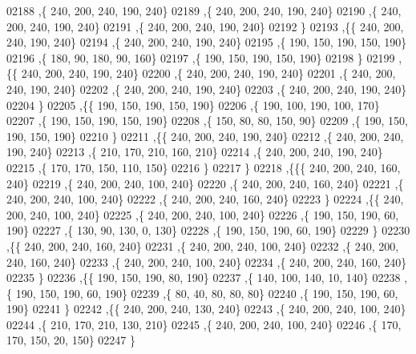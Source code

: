 \begin{DoxyCode}
02188     ,\{   240,   200,   240,   190,   240\}
02189     ,\{   240,   200,   240,   190,   240\}
02190     ,\{   240,   200,   240,   190,   240\}
02191     ,\{   240,   200,   240,   190,   240\}
02192     \}
02193    ,\{\{   240,   200,   240,   190,   240\}
02194     ,\{   240,   200,   240,   190,   240\}
02195     ,\{   190,   150,   190,   150,   190\}
02196     ,\{   180,    90,   180,    90,   160\}
02197     ,\{   190,   150,   190,   150,   190\}
02198     \}
02199    ,\{\{   240,   200,   240,   190,   240\}
02200     ,\{   240,   200,   240,   190,   240\}
02201     ,\{   240,   200,   240,   190,   240\}
02202     ,\{   240,   200,   240,   190,   240\}
02203     ,\{   240,   200,   240,   190,   240\}
02204     \}
02205    ,\{\{   190,   150,   190,   150,   190\}
02206     ,\{   190,   100,   190,   100,   170\}
02207     ,\{   190,   150,   190,   150,   190\}
02208     ,\{   150,    80,    80,   150,    90\}
02209     ,\{   190,   150,   190,   150,   190\}
02210     \}
02211    ,\{\{   240,   200,   240,   190,   240\}
02212     ,\{   240,   200,   240,   190,   240\}
02213     ,\{   210,   170,   210,   160,   210\}
02214     ,\{   240,   200,   240,   190,   240\}
02215     ,\{   170,   170,   150,   110,   150\}
02216     \}
02217    \}
02218   ,\{\{\{   240,   200,   240,   160,   240\}
02219     ,\{   240,   200,   240,   100,   240\}
02220     ,\{   240,   200,   240,   160,   240\}
02221     ,\{   240,   200,   240,   100,   240\}
02222     ,\{   240,   200,   240,   160,   240\}
02223     \}
02224    ,\{\{   240,   200,   240,   100,   240\}
02225     ,\{   240,   200,   240,   100,   240\}
02226     ,\{   190,   150,   190,    60,   190\}
02227     ,\{   130,    90,   130,     0,   130\}
02228     ,\{   190,   150,   190,    60,   190\}
02229     \}
02230    ,\{\{   240,   200,   240,   160,   240\}
02231     ,\{   240,   200,   240,   100,   240\}
02232     ,\{   240,   200,   240,   160,   240\}
02233     ,\{   240,   200,   240,   100,   240\}
02234     ,\{   240,   200,   240,   160,   240\}
02235     \}
02236    ,\{\{   190,   150,   190,    80,   190\}
02237     ,\{   140,   100,   140,    10,   140\}
02238     ,\{   190,   150,   190,    60,   190\}
02239     ,\{    80,    40,    80,    80,    80\}
02240     ,\{   190,   150,   190,    60,   190\}
02241     \}
02242    ,\{\{   240,   200,   240,   130,   240\}
02243     ,\{   240,   200,   240,   100,   240\}
02244     ,\{   210,   170,   210,   130,   210\}
02245     ,\{   240,   200,   240,   100,   240\}
02246     ,\{   170,   170,   150,    20,   150\}
02247     \}

\end{DoxyCode}
